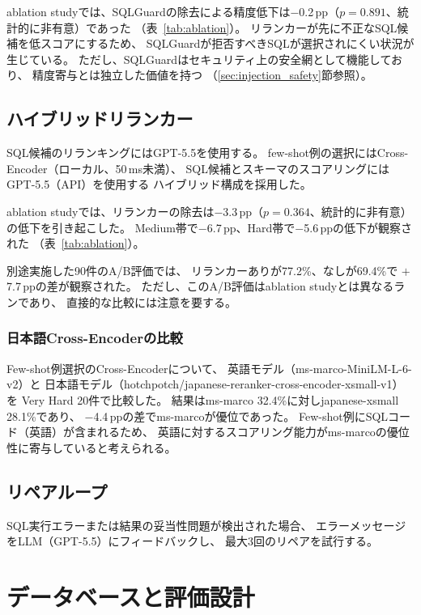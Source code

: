 \documentclass[5p,twocolumn]{elsarticle}
\begin{document}
ablation studyでは、SQLGuardの除去による精度低下は$-$0.2\,pp（$p=0.891$、統計的に非有意）であった
（表~\ref{tab:ablation}）。
リランカーが先に不正なSQL候補を低スコアにするため、
SQLGuardが拒否すべきSQLが選択されにくい状況が生じている。
ただし、SQLGuardはセキュリティ上の安全網として機能しており、
精度寄与とは独立した価値を持つ
（\ref{sec:injection_safety}節参照）。

\subsection{ハイブリッドリランカー}

SQL候補のリランキングにはGPT-5.5を使用する。
few-shot例の選択にはCross-Encoder（ローカル、50\,ms未満）、
SQL候補とスキーマのスコアリングにはGPT-5.5（API）を使用する
ハイブリッド構成を採用した。

ablation studyでは、リランカーの除去は$-$3.3\,pp（$p=0.364$、統計的に非有意）の低下を引き起こした。
Medium帯で$-$6.7\,pp、Hard帯で$-$5.6\,ppの低下が観察された
（表~\ref{tab:ablation}）。

別途実施した90件のA/B評価では、
リランカーありが77.2\%、なしが69.4\%で
$+$7.7\,ppの差が観察された。
ただし、このA/B評価はablation studyとは異なるランであり、
直接的な比較には注意を要する。

\subsubsection{日本語Cross-Encoderの比較}

Few-shot例選択のCross-Encoderについて、
英語モデル（ms-marco-MiniLM-L-6-v2）と
日本語モデル（hotchpotch/japanese-reranker-cross-encoder-xsmall-v1）を
Very Hard 20件で比較した。
結果はms-marco 32.4\%に対しjapanese-xsmall 28.1\%であり、
$-$4.4\,ppの差でms-marcoが優位であった。
Few-shot例にSQLコード（英語）が含まれるため、
英語に対するスコアリング能力がms-marcoの優位性に寄与していると考えられる。

\subsection{リペアループ}
\label{sec:repair}

SQL実行エラーまたは結果の妥当性問題が検出された場合、
エラーメッセージをLLM（GPT-5.5）にフィードバックし、
最大3回のリペアを試行する。

\section{データベースと評価設計}
\label{sec:evaluation}
\end{document}
